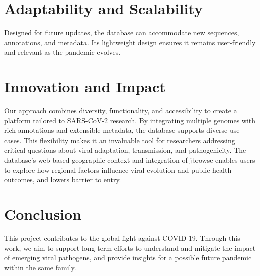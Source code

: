 \documentclass[11pt]{article}
\begin{document}
\section{Adaptability and Scalability}
Designed for future updates, the database can accommodate new sequences, annotations, and metadata.
Its lightweight design ensures it remains user-friendly and relevant as the pandemic evolves.

\section{Innovation and Impact}

Our approach combines diversity, functionality, and accessibility to create a platform tailored to SARS-CoV-2 research.
By integrating multiple genomes with rich annotations and extensible metadata, the database supports diverse use cases.
This flexibility makes it an invaluable tool for researchers addressing critical questions about viral adaptation,
transmission, and pathogenicity. The database's web-based geographic context and integration of jbrowse enables users to
explore how regional factors influence viral evolution and public health outcomes, and lowers barrier to entry.

\section{Conclusion}

This project contributes to the global fight against COVID-19. Through this work, we aim to support long-term efforts to
understand and mitigate the impact of emerging viral pathogens, and provide insights for a possible future pandemic within
the same family.
\end{document}
